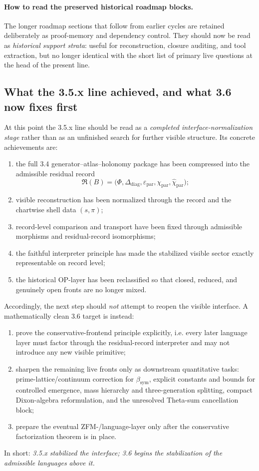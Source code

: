 \documentclass[12pt,a4paper]{article}
\newcommand{\bsym}{\beta_{\mathrm{sym}}}
\begin{document}
\paragraph{How to read the preserved historical roadmap blocks.}
The longer roadmap sections that follow from earlier cycles are retained deliberately as proof-memory and dependency control. They should now be read as \emph{historical support strata}: useful for reconstruction, closure auditing, and tool extraction, but no longer identical with the short list of primary live questions at the head of the present line.

\subsection*{What the 3.5.x line achieved, and what 3.6 now fixes first}
At this point the 3.5.x line should be read as a \emph{completed interface-normalization stage} rather than as an unfinished search for further visible structure.
Its concrete achievements are:
\begin{enumerate}[leftmargin=2em]
 \item the full 3.4 generator--atlas--holonomy package has been compressed into the admissible residual record
 \[
 \mathfrak R(B)=\bigl(\Phi,\Delta_{\mathrm{diag}},\varepsilon_{\mathrm{par}},\chi_{\mathrm{par}},\widehat\chi_{\mathrm{par}}\bigr);
 \]
 \item visible reconstruction has been normalized through the record and the chartwise shell data \((s,\pi)\);
 \item record-level comparison and transport have been fixed through admissible morphisms and residual-record isomorphisms;
 \item the faithful interpreter principle has made the stabilized visible sector exactly representable on record level;
 \item the historical OP-layer has been reclassified so that closed, reduced, and genuinely open fronts are no longer mixed.
\end{enumerate}
Accordingly, the next step should \emph{not} attempt to reopen the visible interface.
A mathematically clean 3.6 target is instead:
\begin{enumerate}[leftmargin=2em,label=(\roman*)]
 \item prove the conservative-frontend principle explicitly, i.e. every later language layer must factor through the residual-record interpreter and may not introduce any new visible primitive;
 \item sharpen the remaining live fronts only as downstream quantitative tasks: prime-lattice/continuum correction for \(\bsym\), explicit constants and bounds for controlled emergence, mass hierarchy and three-generation splitting, compact Dixon-algebra reformulation, and the unresolved Theta-sum cancellation block;
 \item prepare the eventual ZFM-/language-layer only after the conservative factorization theorem is in place.
\end{enumerate}
In short: \emph{3.5.x stabilized the interface; 3.6 begins the stabilization of the admissible languages above it.}
\end{document}
